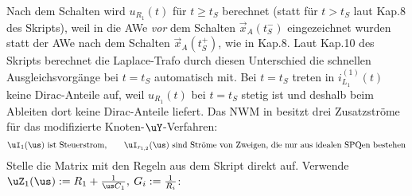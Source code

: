 \documentclass[ngerman,10pt,a4paper]{article}%
\begin{document}
%
%
\anm Nach dem Schalten wird $u_{R_1}(t)$ für $t\geq t_S$ berechnet (statt für $t>t_S$ laut Kap.8 des Skripts), weil in  die AWe \textit{vor} dem Schalten $\vec{x}_A(t_S^-)$ eingezeichnet wurden statt der AWe nach dem Schalten $\vec{x}_A(t_S^+)$, wie in Kap.8. Laut Kap.10 des Skripts berechnet die Laplace-Trafo durch diesen Unterschied die schnellen Ausgleichsvorgänge bei $t=t_S$ automatisch mit.
%
\anm Bei $t=t_S$ treten in $i_{L_1}^{(1)}(t)$ keine Dirac-Anteile auf, weil $u_{R_1}(t)$ bei $t=t_S$ stetig ist und deshalb beim Ableiten dort keine Dirac-Anteile liefert.
%
%
%
%
%
%
%
Das NWM in  besitzt drei Zusatzströme für das modifizierte Knoten-$\uY$-Verfahren:
\[%
	\uI_1(\us)\text{ ist Steuerstrom,}\qquad \uI_{r_{1,2}}(\us)\text{ sind Ströme von Zweigen, die nur aus idealen SPQen bestehen}%
\]%
%
Stelle die Matrix mit den Regeln aus dem Skript direkt auf. Verwende $\uZ_1(\us):=R_1+\frac{1}{\us C_1},\: G_i:=\frac{1}{R_i}$:
\end{document}
